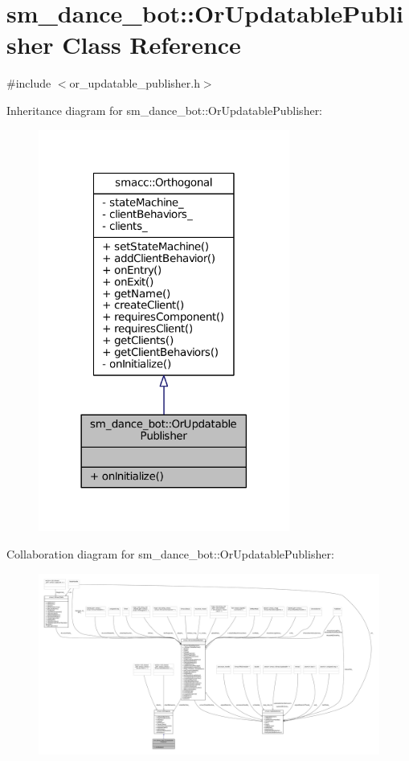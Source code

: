 \hypertarget{classsm__dance__bot_1_1OrUpdatablePublisher}{}\section{sm\+\_\+dance\+\_\+bot\+:\+:Or\+Updatable\+Publisher Class Reference}
\label{classsm__dance__bot_1_1OrUpdatablePublisher}


{\ttfamily \#include $<$or\+\_\+updatable\+\_\+publisher.\+h$>$}



Inheritance diagram for sm\+\_\+dance\+\_\+bot\+:\+:Or\+Updatable\+Publisher\+:
\nopagebreak
\begin{figure}[H]
\begin{center}
\leavevmode
\includegraphics[width=234pt]{classsm__dance__bot_1_1OrUpdatablePublisher__inherit__graph}
\end{center}
\end{figure}


Collaboration diagram for sm\+\_\+dance\+\_\+bot\+:\+:Or\+Updatable\+Publisher\+:
\nopagebreak
\begin{figure}[H]
\begin{center}
\leavevmode
\includegraphics[width=350pt]{classsm__dance__bot_1_1OrUpdatablePublisher__coll__graph}
\end{center}
\end{figure}
